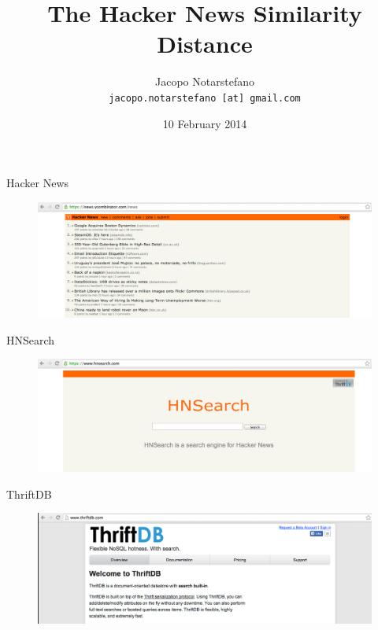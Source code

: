 \documentclass[12pt]{beamer}
\title{The Hacker News Similarity Distance}
\author[Jacopo Notarstefano]{
    Jacopo Notarstefano\\
    \texttt{jacopo.notarstefano [at] gmail.com}
}
\date{10 February 2014}
\begin{document}
    \begin{frame}[plain]
        \titlepage
    \end{frame}

    \begin{frame}{Hacker News}
        \begin{figure}
            \centering
            \includegraphics[width=\linewidth,keepaspectratio=true]{tex/img/hackernews.png}
        \end{figure}
    \end{frame}

    \begin{frame}{HNSearch}
        \begin{figure}
            \centering
            \includegraphics[width=\linewidth,keepaspectratio=true]{tex/img/hnsearch.png}
        \end{figure}
    \end{frame}

    \begin{frame}{ThriftDB}
        \begin{figure}
            \centering
            \includegraphics[width=\linewidth,keepaspectratio=true]{tex/img/thriftdb.png}
        \end{figure}
    \end{frame}
\end{document}
